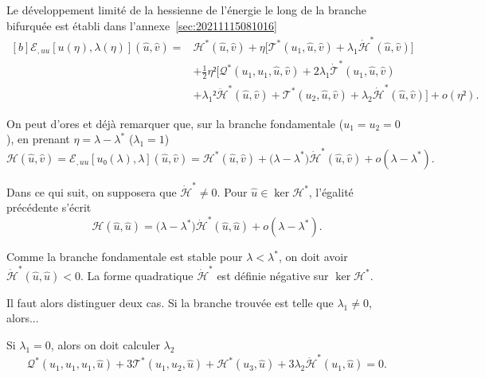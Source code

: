 \documentclass[12pt, final]{amsart}
\begin{document}
Le développement limité de la hessienne de l'énergie le long de la
branche bifurquée est établi dans l'annexe~\ref{sec:20211115081016}
\begin{equation}
  \label{eq:20211115082025}
  \begin{aligned}[b]
    ℰ_{,uu}[u(η), \lambda(η)](\hat{u}, \hat{v})
    ={}&\mathcal H^\ast(\hat{u}, \hat{v})
    +η\bigl[\mathcal T^\ast(u_1, \hat{u}, \hat{v})
    +\lambda_1\dot{\mathcal H}^\ast(\hat{u}, \hat{v})\bigr]\\
    &+\tfrac12η²\bigl[\mathcal Q^\ast(u_1, u_1, \hat{u}, \hat{v})
    +2\lambda_1\dot{\mathcal T}^\ast(u_1, \hat{u}, \hat{v})\\
    &+\lambda_1²\ddot{\mathcal H}^\ast(\hat{u}, \hat{v})
    +\mathcal T^\ast(u_2, \hat{u}, \hat{v})
    +\lambda_2\dot{\mathcal H}^\ast(\hat{u}, \hat{v})\bigr]+o(η²).
  \end{aligned}
\end{equation}

On peut d'ores et déjà remarquer que, sur la branche fondamentale
(\(u_1=u_2=0\)), en prenant \(η=\lambda-\lambda^\ast\) (\(\lambda_1=1\))
\begin{equation}
  \mathcal H(\hat{u}, \hat{v})
  =ℰ_{,uu}[u₀(\lambda), \lambda](\hat{u}, \hat{v})
  =\mathcal H^\ast(\hat{u}, \hat{v})
  +\bigl(\lambda-\lambda^\ast\bigr)\dot{\mathcal H}^\ast(\hat{u}, \hat{v})
  +o(\lambda-\lambda^\ast).
\end{equation}

Dans ce qui suit, on supposera que \(\dot{\mathcal H}^\ast≠ 0\). Pour
\(\hat{u}∈\ker\mathcal H^\ast\), l'égalité précédente s'écrit
\begin{equation}
  \mathcal H(\hat{u}, \hat{u})
  =\bigl(\lambda-\lambda^\ast\bigr)\dot{\mathcal H}^\ast(\hat{u}, \hat{u})
  +o(\lambda-\lambda^\ast).
\end{equation}

Comme la branche fondamentale est stable pour \(\lambda<\lambda^\ast\), on doit
avoir \(\dot{\mathcal H}^\ast(\hat{u}, \hat{u})<0\). La forme quadratique
\(\dot{\mathcal H}^\ast\) est définie négative sur \(\ker\mathcal H^\ast\).


Il faut alors distinguer deux cas. Si la branche trouvée est telle que
\(\lambda_1≠0\), alors...

Si \(\lambda_1=0\), alors on doit calculer \(\lambda_2\)
\begin{equation}
  \mathcal Q^\ast(u_1, u_1, u_1, \hat{u})
  +3\mathcal T^\ast(u_1, u_2, \hat{u})+\mathcal H^\ast(u_3, \hat{u})
  +3\lambda_2\dot{\mathcal H}^\ast(u_1, \hat{u})=0.
\end{equation}
\end{document}
